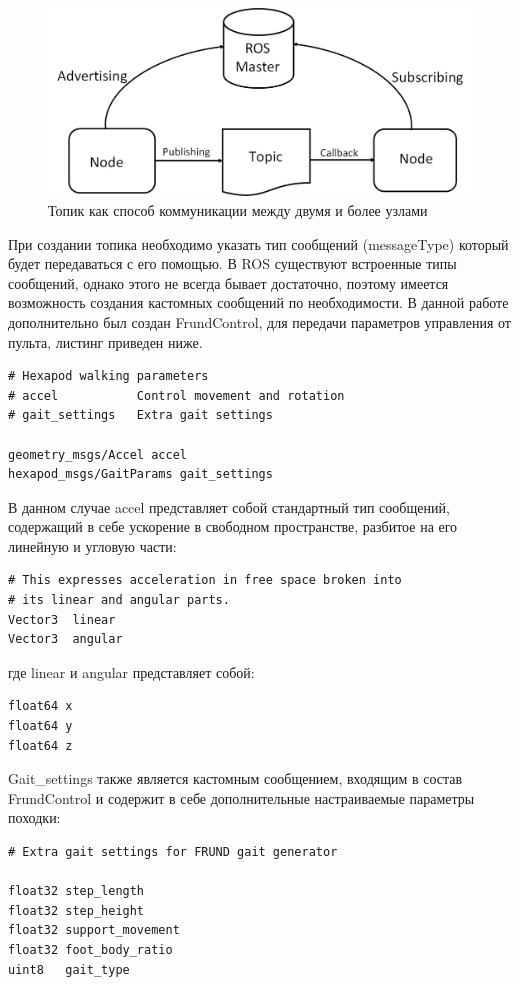 \begin{figure}[h!]
	\centering
	\includegraphics[width = 0.8\linewidth]{img/topic}
	\caption{Топик как способ коммуникации между двумя и более узлами}
	\label{img:topic}
\end{figure}

При создании топика необходимо указать тип сообщений (messageType) который будет передаваться с его помощью. В ROS существуют встроенные типы сообщений, однако этого не всегда бывает достаточно, поэтому имеется возможность создания кастомных сообщений по необходимости. В данной работе дополнительно был создан FrundControl, для передачи параметров управления от пульта, листинг приведен ниже.

\begin{lstlisting}[frame=single]
# Hexapod walking parameters
# accel           Control movement and rotation
# gait_settings   Extra gait settings

geometry_msgs/Accel accel
hexapod_msgs/GaitParams gait_settings
\end{lstlisting}

В данном случае accel представляет собой стандартный тип сообщений, содержащий в себе ускорение в свободном пространстве, разбитое на его линейную и угловую части:

\begin{lstlisting}[frame=single]
# This expresses acceleration in free space broken into 
# its linear and angular parts.
Vector3  linear
Vector3  angular
\end{lstlisting}

где linear и angular представляет собой:

\begin{lstlisting}[frame=single]
float64 x
float64 y
float64 z
\end{lstlisting}

Gait\_settings также является кастомным сообщением, входящим в состав FrundControl и содержит в себе дополнительные настраиваемые параметры походки:

\begin{lstlisting}[frame=single]
# Extra gait settings for FRUND gait generator

float32 step_length
float32 step_height
float32 support_movement
float32 foot_body_ratio
uint8   gait_type
\end{lstlisting}


